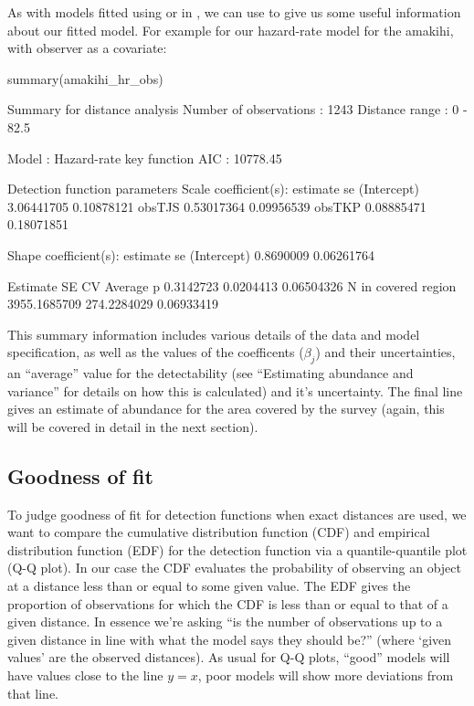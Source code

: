 \documentclass[article]{jss}
\begin{document}
As with models fitted using  or  in , we
can use  to give us some useful information about our
fitted model. For example for our hazard-rate model for the amakihi,
with observer as a covariate:

\begin{CodeChunk}
\begin{CodeInput}
summary(amakihi_hr_obs)
\end{CodeInput}
\begin{CodeOutput}

Summary for distance analysis 
Number of observations :  1243 
Distance range         :  0  -  82.5 

Model : Hazard-rate key function 
AIC   : 10778.45 

Detection function parameters
Scale coefficient(s):  
              estimate         se
(Intercept) 3.06441705 0.10878121
obsTJS      0.53017364 0.09956539
obsTKP      0.08885471 0.18071851

Shape coefficient(s):  
             estimate         se
(Intercept) 0.8690009 0.06261764

                        Estimate          SE         CV
Average p              0.3142723   0.0204413 0.06504326
N in covered region 3955.1685709 274.2284029 0.06933419
\end{CodeOutput}
\end{CodeChunk}

This summary information includes various details of the data and model
specification, as well as the values of the coefficents (\(\beta_j\))
and their uncertainties, an ``average'' value for the detectability (see
``Estimating abundance and variance'' for details on how this is
calculated) and it's uncertainty. The final line gives an estimate of
abundance for the area covered by the survey (again, this will be
covered in detail in the next section).

\subsection{Goodness of fit}\label{goodness-of-fit}

To judge goodness of fit for detection functions when exact distances
are used, we want to compare the cumulative distribution function (CDF)
and empirical distribution function (EDF) for the detection function via
a quantile-quantile plot (Q-Q plot). In our case the CDF evaluates the
probability of observing an object at a distance less than or equal to
some given value. The EDF gives the proportion of observations for which
the CDF is less than or equal to that of a given distance. In essence
we're asking ``is the number of observations up to a given distance in
line with what the model says they should be?'' (where `given values'
are the observed distances). As usual for Q-Q plots, ``good'' models
will have values close to the line \(y=x\), poor models will show more
deviations from that line.
\end{document}
